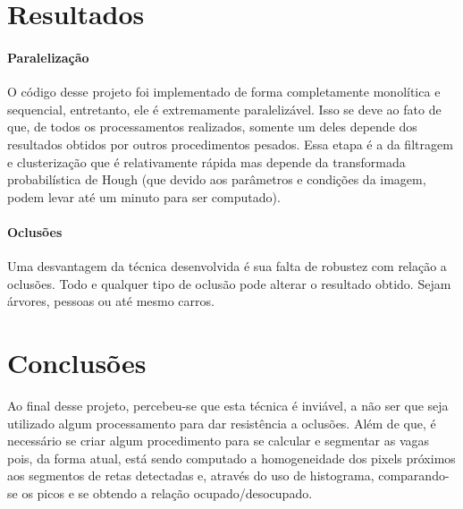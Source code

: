 \documentclass[10pt,twocolumn,letterpaper]{article}
\begin{document}
\section{Resultados}

\paragraph{Paralelização}
	O código desse projeto foi implementado de forma completamente monolítica e sequencial,
entretanto, ele é extremamente paralelizável. Isso se deve ao fato de que, de todos os processamentos
realizados, somente um deles depende dos resultados obtidos por outros procedimentos pesados.
Essa etapa é a da filtragem e clusterização que é relativamente rápida mas depende da transformada
probabilística de Hough (que devido aos parâmetros e condições da imagem, podem levar até um minuto
para ser computado).

\paragraph{Oclusões}
	Uma desvantagem da técnica desenvolvida é sua falta de robustez com relação a oclusões.
Todo e qualquer tipo de oclusão pode alterar o resultado obtido. Sejam árvores, pessoas ou até
mesmo carros.


\section{Conclusões}
	Ao final desse projeto, percebeu-se que esta técnica é inviável, a não ser que seja utilizado
algum processamento para dar resistência a oclusões. Além de que, é necessário se criar algum
procedimento para se calcular e segmentar as vagas pois, da forma atual, está sendo computado
a homogeneidade dos pixels próximos aos segmentos de retas detectadas e, através do uso de
histograma, comparando-se os picos e se obtendo a relação ocupado/desocupado.



{\small


}
\end{document}
